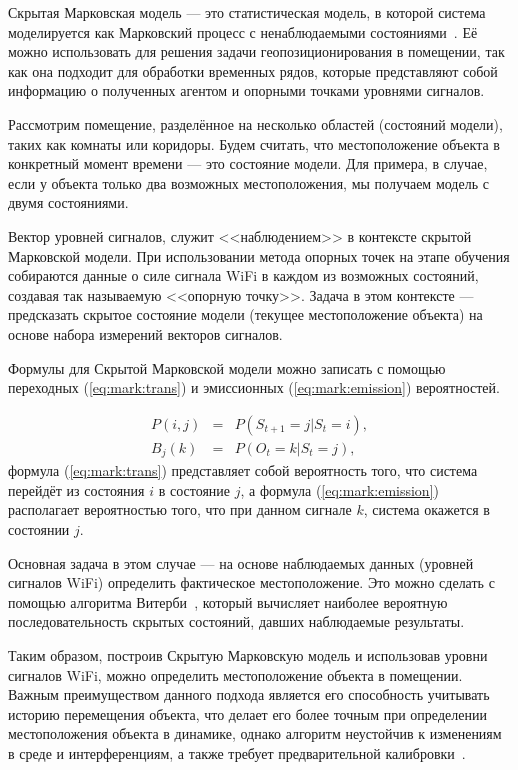 Скрытая Марковская модель --- это статистическая модель, в которой система моделируется как Марковский процесс с ненаблюдаемыми состояниями~\cite{mor2021systematic}. Её можно использовать для решения задачи геопозиционирования в помещении, так как она подходит для обработки временных рядов, которые представляют собой информацию о полученных агентом и опорными точками уровнями сигналов.

Рассмотрим помещение, разделённое на несколько областей (состояний модели), таких как комнаты или коридоры. Будем считать, что местоположение объекта в конкретный момент времени --- это состояние модели. Для примера, в случае, если у объекта только два возможных местоположения, мы получаем модель с двумя состояниями.

Вектор уровней сигналов, служит <<наблюдением>> в контексте скрытой Марковской модели. При использовании метода опорных точек на этапе обучения собираются данные о силе сигнала WiFi в каждом из возможных состояний, создавая так называемую <<опорную точку>>. Задача в этом контексте --- предсказать скрытое состояние модели (текущее местоположение объекта) на основе набора измерений векторов сигналов.

Формулы для Скрытой Марковской модели можно записать с помощью переходных (\ref{eq:mark:trans}) и эмиссионных (\ref{eq:mark:emission}) вероятностей.

\begin{eqnarray}
    P(i, j) &=& P(S_{t+1}=j|S_t=i), \label{eq:mark:trans} \\
    B_j(k) &=& P(O_t=k|S_t=j), \label{eq:mark:emission}
\end{eqnarray}
формула (\ref{eq:mark:trans}) представляет собой вероятность того, что система перейдёт из состояния $i$ в состояние $j$, а формула (\ref{eq:mark:emission}) располагает вероятностью того, что при данном сигнале $k$, система окажется в состоянии $j$.

Основная задача в этом случае --- на основе наблюдаемых данных (уровней сигналов WiFi) определить фактическое местоположение. Это можно сделать с помощью алгоритма Витерби~\cite{dong2020sequential}, который вычисляет наиболее вероятную последовательность скрытых состояний, давших наблюдаемые результаты.

Таким образом, построив Скрытую Марковскую модель и использовав уровни сигналов WiFi, можно определить местоположение объекта в помещении. Важным преимуществом данного подхода является его способность учитывать историю перемещения объекта, что делает его более точным при определении местоположения объекта в динамике, однако алгоритм неустойчив к изменениям в среде и интерференциям, а также требует предварительной калибровки~\cite{rudic2020geometry}.

